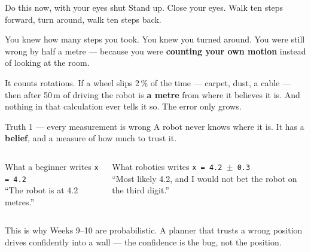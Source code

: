 \documentclass[aspectratio=169]{beamer}
\begin{document}
\begin{frame}{Do this now, with your eyes shut}
  \small
  Stand up. Close your eyes. Walk ten steps forward, turn around, walk ten steps back.

  \vspace{0.9em}

  \vspace{0.9em}
  You knew how many steps you took. You knew you turned around. You were still wrong by half
  a metre --- because you were \textbf{counting your own motion} instead of looking at the room.

  \vspace{0.9em}
  \begin{underhood}
    \footnotesize
    It counts rotations. If a wheel slips 2\,\% of the time --- carpet, dust, a cable --- then
    after 50\,m of driving the robot is \textbf{a metre} from where it believes it is. And
    nothing in that calculation ever tells it so. The error only grows.
  \end{underhood}
\end{frame}

\begin{frame}{Truth 1 --- every measurement is wrong}
  \small
  A robot never knows where it is. It has a \textbf{belief}, and a measure of how much to
  trust it.

  \vspace{0.6em}
  \begin{columns}[T,onlytextwidth]
    \begin{block}{\small What a beginner writes}
      \footnotesize
      \texttt{x = 4.2} \\[0.3em]
      ``The robot is at 4.2 metres.''
    \end{block}
    \begin{block}{\small What robotics writes}
      \footnotesize
      \texttt{x = 4.2 $\pm$ 0.3} \\[0.3em]
      ``Most likely 4.2, and I would not bet the robot on the third digit.''
    \end{block}
  \end{columns}

  \vspace{0.9em}
  \begin{underhood}
    \footnotesize
    This is why Weeks 9--10 are probabilistic. A planner that trusts a wrong position drives
    confidently into a wall --- the confidence is the bug, not the position.
  \end{underhood}
\end{frame}
\end{document}
